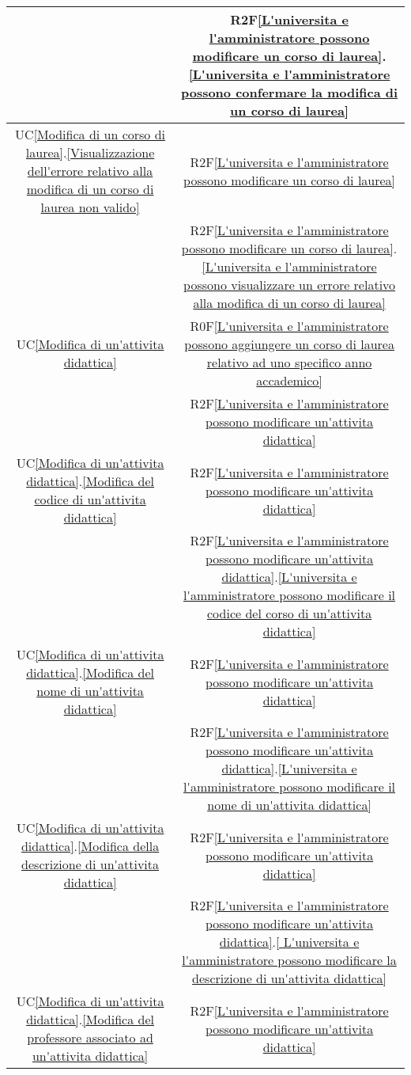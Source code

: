 \begin{longtable}{|c|c|}
& R2F\ref{L'universita e l'amministratore possono modificare un corso di laurea}.\ref{L'universita e l'amministratore possono confermare la modifica di un corso di laurea}\\
\hline
UC\ref{Modifica di un corso di laurea}.\ref{Visualizzazione dell'errore relativo alla modifica di un corso di laurea non valido} & R2F\ref{L'universita e l'amministratore possono modificare un corso di laurea}\\
& R2F\ref{L'universita e l'amministratore possono modificare un corso di laurea}.\ref{L'universita e l'amministratore possono visualizzare un errore relativo alla modifica di un corso di laurea}\\
\hline
UC\ref{Modifica di un'attivita didattica} & R0F\ref{L'universita e l'amministratore possono aggiungere un corso di laurea relativo ad uno specifico anno accademico}\\
& R2F\ref{L'universita e l'amministratore possono modificare un'attivita didattica}\\
\hline
UC\ref{Modifica di un'attivita didattica}.\ref{Modifica del codice di un'attivita didattica} & R2F\ref{L'universita e l'amministratore possono modificare un'attivita didattica}\\
& R2F\ref{L'universita e l'amministratore possono modificare un'attivita didattica}.\ref{L'universita e l'amministratore possono modificare il codice del corso di un'attivita didattica}\\
\hline
UC\ref{Modifica di un'attivita didattica}.\ref{Modifica del nome di un'attivita didattica} & R2F\ref{L'universita e l'amministratore possono modificare un'attivita didattica}\\
& R2F\ref{L'universita e l'amministratore possono modificare un'attivita didattica}.\ref{L'universita e l'amministratore possono modificare il nome di un'attivita didattica}\\
\hline
UC\ref{Modifica di un'attivita didattica}.\ref{Modifica della descrizione di un'attivita didattica} & R2F\ref{L'universita e l'amministratore possono modificare un'attivita didattica}\\
& R2F\ref{L'universita e l'amministratore possono modificare un'attivita didattica}.\ref{ L'universita e l'amministratore possono modificare la descrizione di un'attivita didattica}\\
\hline
UC\ref{Modifica di un'attivita didattica}.\ref{Modifica del professore associato ad un'attivita didattica} & R2F\ref{L'universita e l'amministratore possono modificare un'attivita didattica}\\

\end{longtable}
